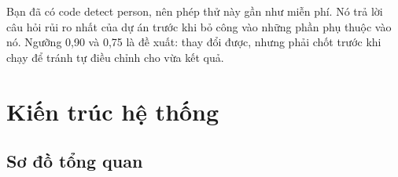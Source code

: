 \documentclass[10pt,a4paper,oneside,openany]{report}
\begin{document}
\begin{meo}
Bạn đã có code detect person, nên phép thử này gần như miễn phí. Nó trả lời câu hỏi rủi ro nhất của dự án trước khi bỏ công vào
những phần phụ thuộc vào nó. Ngưỡng 0,90 và 0,75 là đề xuất: thay đổi được, nhưng phải chốt trước khi chạy để tránh tự điều chỉnh
cho vừa kết quả.
\end{meo}
\chapter{Kiến trúc hệ thống}\label{ch:kientruc}

\section{Sơ đồ tổng quan}
\end{document}
